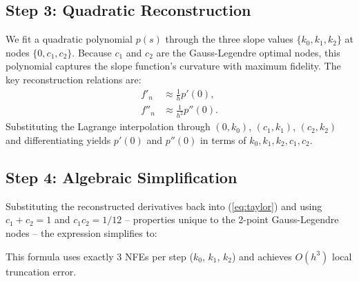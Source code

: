 \documentclass[conference]{IEEEtran}
\begin{document}
\subsection{Step 3: Quadratic Reconstruction}

We fit a quadratic polynomial $p(s)$ through the three slope values
$\{k_0, k_1, k_2\}$ at nodes $\{0, c_1, c_2\}$. Because $c_1$ and $c_2$
are the Gauss-Legendre optimal nodes, this polynomial captures the
slope function's curvature with maximum fidelity. The key reconstruction
relations are:
%
\begin{align}
    f'_n &\approx \frac{1}{h} p'(0), \\
    f''_n &\approx \frac{1}{h^2} p''(0).
\end{align}
%
Substituting the Lagrange interpolation through $(0, k_0)$, $(c_1, k_1)$,
$(c_2, k_2)$ and differentiating yields $p'(0)$ and $p''(0)$ in terms
of $k_0, k_1, k_2, c_1, c_2$.

\subsection{Step 4: Algebraic Simplification}

Substituting the reconstructed derivatives back into
(\ref{eq:taylor}) and using $c_1 + c_2 = 1$ and $c_1 c_2 = 1/12$
-- properties unique to the 2-point Gauss-Legendre nodes -- the
expression simplifies to:

\medskip
\noindent\begin{minipage}{\linewidth}
\centering
{}
\end{minipage}
\medskip

This formula uses exactly 3 NFEs per step ($k_0$, $k_1$, $k_2$) and
achieves $O(h^3)$ local truncation error.
\end{document}
